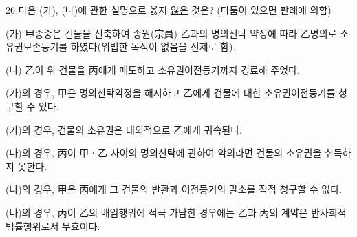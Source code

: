 \begin{question}{26}
다음 (가), (나)에 관한 설명으로 옳지 \uline{않은} 것은? (다툼이 있으면 판례에 의함)
\begin{framedtext}
(가) 甲종중은 건물을 신축하여 종원(宗員) 乙과의 명의신탁 약정에 따라 乙명의로 소유권보존등기를 하였다(위법한 목적이 없음을 전제로 함). \par
(나) 乙이 위 건물을 丙에게 매도하고 소유권이전등기까지 경료해 주었다. \par
\end{framedtext}
\begin{choices}
  \item (가)의 경우, 甲은 명의신탁약정을 해지하고 乙에게 건물에 대한 소유권이전등기를 청구할 수 있다.
  \item (가)의 경우, 건물의 소유권은 대외적으로 乙에게 귀속된다.
  \item (나)의 경우, 丙이 甲ㆍ乙 사이의 명의신탁에 관하여 악의라면 건물의 소유권을 취득하지 못한다.
  \item (나)의 경우, 甲은 丙에게 그 건물의 반환과 이전등기의 말소를 직접 청구할 수 없다.
  \item (나)의 경우, 丙이 乙의 배임행위에 적극 가담한 경우에는 乙과 丙의 계약은 반사회적 법률행위로서 무효이다.
\end{choices}
\end{question}

